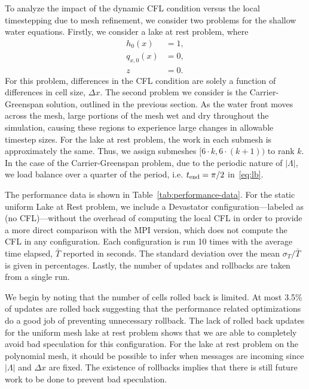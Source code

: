 To analyze the impact of the dynamic CFL condition versus the local timestepping due to mesh refinement, we consider two problems for the shallow water equations. Firstly, we consider a lake at rest problem, where
\begin{align*}
h_0(x) &= 1,\\
q_{x,0}(x) &= 0,\\
z &= 0.
\end{align*}
For this problem, differences in the CFL condition are solely a function of differences in cell size, $\Delta x$. The second problem we consider is the Carrier-Greenspan solution, outlined in the previous section. As the water front moves across the mesh, large portions of the mesh wet and dry throughout the simulation, causing these regions to experience large changes in allowable timestep sizes. For the lake at rest problem, the work in each submesh is approximately the same. Thus, we assign submeshes $[6\cdot k, 6 \cdot(k+1))$ to rank $k$. In the case of the Carrier-Greenspan problem, due to the periodic nature of $|\Lambda|$, we load balance over a quarter of the period, i.e. $t_{\text{end}}=\pi/2$ in~\eqref{eq:lb}. 


The performance data is shown in Table~\ref{tab:performance-data}. For the static uniform Lake at Rest problem, we include a Devastator configuration---labeled as (no CFL)---without the overhead of computing the local CFL in order to provide a more direct comparison with the MPI version, which does not compute the CFL in any configuration.  Each configuration is run 10 times with the average time elapsed, $\bar{T}$ reported in seconds. The standard deviation over the mean $\sigma_T/\bar{T}$ is given in percentages. Lastly, the number of updates and rollbacks are taken from a single run.  

We begin by noting that the number of cells rolled back is limited. At most 3.5\% of updates are rolled back suggesting that the performance related optimizations do a good job of preventing unnecessary rollback. The lack of rolled back updates for the uniform mesh lake at rest problem shows that we are able to completely avoid bad speculation for this configuration. For the lake at rest problem on the polynomial mesh, it should be possible to infer when messages are incoming since $|\Lambda|$ and $\Delta x$ are fixed. The existence of rollbacks implies that there is still future work to be done to prevent bad speculation.

